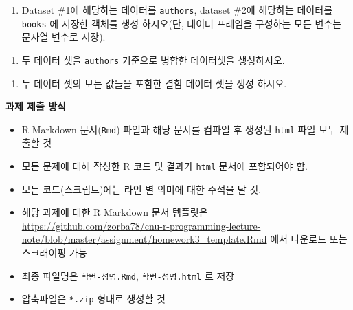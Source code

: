 \documentclass[
  11pt,
]{krantz}
\makeatletter
\providecommand{\tightlist}{%
  \setlength{\itemsep}{0pt}\setlength{\parskip}{0pt}}
\newenvironment{kframe}{%
\medskip{}
\setlength{\fboxsep}{.8em}
 \def\at@end@of@kframe{}%
 \ifinner\ifhmode%
  \def\at@end@of@kframe{\end{minipage}}%
  \begin{minipage}{\columnwidth}%
 \fi\fi%
 \def\FrameCommand##1{\hskip\@totalleftmargin \hskip-\fboxsep
 \colorbox{shadecolor}{##1}\hskip-\fboxsep
     \hskip-\linewidth \hskip-\@totalleftmargin \hskip\columnwidth}%
 \MakeFramed {\advance\hsize-\width
   \@totalleftmargin\z@ \linewidth\hsize
   \@setminipage}}%
 {\par\unskip\endMakeFramed%
 \at@end@of@kframe}
\newenvironment{rmdblock}[1]
  {
  \begin{itemize}
  \renewcommand{\labelitemi}{
    \raisebox{-.7\height}[0pt][0pt]{
      {\setkeys{Gin}{width=3em,keepaspectratio}\texttt{[image: images/\#1]}}
    }
  }
  \setlength{\fboxsep}{1em}
  \begin{kframe}
  \item
  }
  {
  \end{kframe}
  \end{itemize}
  }
\newenvironment{rmdimportant}
  {\begin{rmdblock}{important}}
  {\end{rmdblock}}
\makeatother
\begin{document}
\normalsize

\begin{enumerate}
\def\labelenumi{\alph{enumi})}
\tightlist
\item
  Dataset \#1에 해당하는 데이터를 \texttt{authors}, dataset \#2에 해당하는 데이터를 \texttt{books} 에 저장한 객체를 생성 하시오(단, 데이터 프레임을 구성하는 모든 변수는 문자열 변수로 저장).
\end{enumerate}

\begin{enumerate}
\def\labelenumi{\alph{enumi})}
\setcounter{enumi}{1}
\tightlist
\item
  두 데이터 셋을 \texttt{authors} 기준으로 병합한 데이터셋을 생성하시오.
\end{enumerate}

\begin{enumerate}
\def\labelenumi{\alph{enumi})}
\setcounter{enumi}{2}
\tightlist
\item
  두 데이터 셋의 모든 값들을 포함한 결함 데이터 셋을 생성 하시오.
\end{enumerate}

\footnotesize

\begin{rmdimportant}
\begin{rmdimportant}

\textbf{과제 제출 방식}

\begin{itemize}
\tightlist
\item
  R Markdown 문서(\texttt{Rmd}) 파일과 해당 문서를 컴파일 후 생성된 \texttt{html} 파일 모두 제출할 것
\item
  모든 문제에 대해 작성한 R 코드 및 결과가 \texttt{html} 문서에 포함되어야 함.
\item
  모든 코드(스크립트)에는 라인 별 의미에 대한 주석을 달 것.
\item
  해당 과제에 대한 R Markdown 문서 템플릿은 \url{https://github.com/zorba78/cnu-r-programming-lecture-note/blob/master/assignment/homework3_template.Rmd} 에서 다운로드 또는 스크래이핑 가능
\item
  최종 파일명은 \texttt{학번-성명.Rmd}, \texttt{학번-성명.html} 로 저장
\item
  압축파일은 \texttt{*.zip} 형태로 생성할 것
\end{itemize}

\end{rmdimportant}
\end{rmdimportant}

\normalsize
\end{document}
